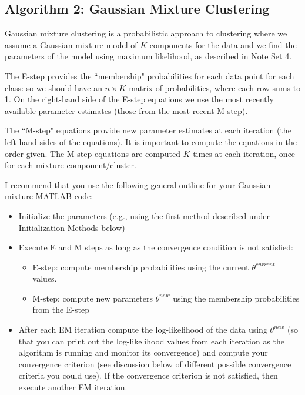 \documentclass[11pt,psfig]{article}
\begin{document}
\subsection*{Algorithm 2: Gaussian Mixture Clustering}


Gaussian mixture clustering is a probabilistic approach to clustering where 
 we assume a Gaussian mixture model of $K$ components
for the data and we find the parameters of the model using maximum likelihood, as described in Note Set 4.  


The E-step provides the ``membership" probabilities  for each data point for
each class: so we should have an $n \times K$ matrix of probabilities, where
each row sums to 1. On the right-hand side of the E-step equations  we use the
most recently available parameter estimates (those from the most recent
M-step).


The ``M-step" equations provide new parameter estimates at each iteration (the
left hand sides of the equations). It is important to compute the equations in
the order given. The M-step equations are computed $K$ times at each iteration,
once for each mixture component/cluster.


I recommend that you use the following general outline
for your Gaussian mixture MATLAB code:
\begin{itemize}
\item Initialize the parameters (e.g., using the first method described under Initialization Methods below)
\item Execute E and M steps as long as the convergence condition is not satisfied:
\begin{itemize}
\item E-step: compute membership probabilities using the current
$\theta^{current}$ values.  
\item M-step: compute new parameters $\theta^{new}$
using the membership probabilities from the E-step 
\end{itemize}
\item After each EM iteration compute the log-likelihood of the data using $\theta^{new}$  (so that you can print   out the log-likelihood values from each iteration as the algorithm is running and monitor its convergence) and compute your convergence criterion (see discussion below of different possible convergence criteria you could use). If the convergence criterion is not satisfied, then execute another EM iteration. 
\end{itemize}
\end{document}
